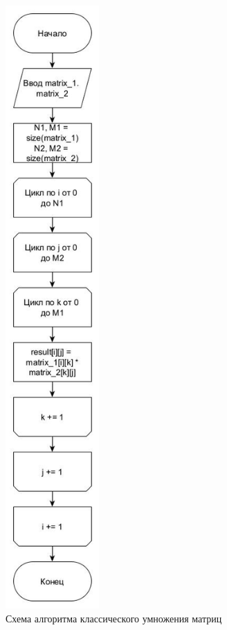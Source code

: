 \FloatBarrier
\begin{figure}[hp]
	\begin{center}
		\includegraphics[height=23cm]{graph/classic.jpg}
	\end{center}
	\caption{Схема алгоритма классического умножения матриц}
\end{figure}
\FloatBarrier

